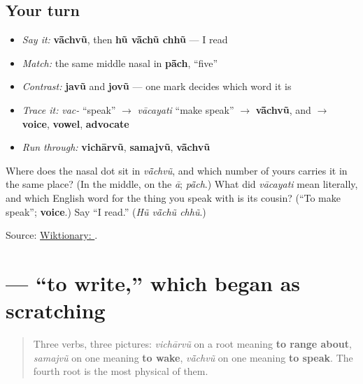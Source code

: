 \subsection*{Your turn}
\begin{itemize}
\raggedright
  \item \emph{Say it:} \textbf{vā̃chvũ}, then \textbf{hũ vā̃chũ chhũ} — I read
  \item \emph{Match:} the same middle nasal in \textbf{pā̃ch}, \textquotedblleft{}five\textquotedblright{}
  \item \emph{Contrast:} \textbf{javũ} and \textbf{jovũ} — one mark decides which word it is
  \item \emph{Trace it:} \emph{vac-} \textquotedblleft{}speak\textquotedblright{} $\to$ \emph{vācayati} \textquotedblleft{}make speak\textquotedblright{} $\to$ \textbf{vā̃chvũ}, and $\to$ \textbf{voice}, \textbf{vowel}, \textbf{advocate}
  \item \emph{Run through:} \textbf{vichārvũ}, \textbf{samajvũ}, \textbf{vā̃chvũ}
\end{itemize}

\begin{tcolorbox}[breakable,colback=teal!4,colframe=teal!35!black,title={Before you move on}]
Where does the nasal dot sit in \emph{vā̃chvũ}, and which number of yours carries it in the same place? (In the middle, on the \emph{ā}; \emph{pā̃ch}.) What did \emph{vācayati} mean literally, and which English word for the thing you speak with is its cousin? (\textquotedblleft{}To make speak\textquotedblright{}; \textbf{voice}.) Say \textquotedblleft{}I read.\textquotedblright{} (\emph{Hũ vā̃chũ chhũ}.)

Source: \href{https://en.wiktionary.org/wiki/\%E0\%AA\%B5\%E0\%AA\%BE\%E0\%AA\%82\%E0\%AA\%9A\%E0\%AA\%B5\%E0\%AB\%81\%E0\%AA\%82}{Wiktionary: }.
\end{tcolorbox}
\section[\texorpdfstring{\gu{લખવું} (lakhvũ)}{લખવું (lakhvũ)}]{ — \textquotedblleft{}to write,\textquotedblright{} which began as scratching}

\label{lesson:GU-C08-lakhvun}



\begin{quote}
Three verbs, three pictures: \emph{vichārvũ} on a root meaning \textbf{to range about}, \emph{samajvũ} on one meaning \textbf{to wake}, \emph{vā̃chvũ} on one meaning \textbf{to speak}. The fourth root is the most physical of them.
\end{quote}

